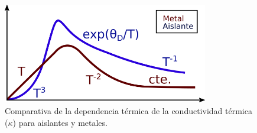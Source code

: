 \begin{figure}[h]
  \centering
  \includegraphics[width=0.8\textwidth]{figures/thermalk.png}
  \caption{Comparativa de la dependencia térmica de la conductividad
    térmica ($\kappa$) para aislantes y metales.}
  \label{fig:thermalk}
\end{figure}

